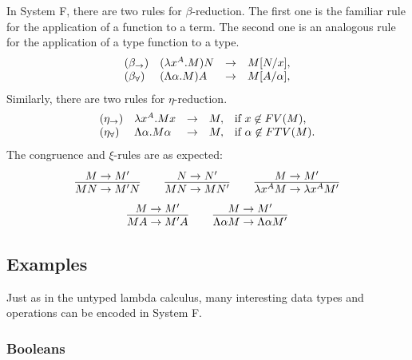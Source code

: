 \documentclass{article}
\begin{document}
In System F, there are two rules for $\beta$-reduction. The first one
is the familiar rule for the application of a function to a term. The
second one is an analogous rule for the application of a type function
to a type. 
\[ \begin{array}{lllll}
  (\beta_{\to}) & (\lambda x^{A}.M)N & \to & M[N/x], \\
  (\beta_{\forall}) & (\Lambda\alpha.M)A & \to & M[A/\alpha],
\end{array}
\]
Similarly, there are two rules for $\eta$-reduction.
\[ \begin{array}{lllll}
  (\eta_{\to}) & \lambda x^{A}.Mx & \to & M, & \mbox{if $x\not\in FV(M)$,} \\
  (\eta_{\forall}) & \Lambda\alpha.M\alpha & \to & M, & \mbox{if $\alpha\not\in FTV(M)$.}
\end{array}
\]
The congruence and $\xi$-rules are as expected:
\[ \deriv{M\to M'}{MN\to M'N}
   \sep
   \deriv{N\to N'}{MN\to MN'}
   \sep
   \deriv{M\to M'}{\lamabs{x}{A}{M}\to\lamabs{x}{A}{M'}}
\]
\[ \deriv{M\to M'}{MA\to M'A}
   \sep
   \deriv{M\to M'}{\Lamabs{\alpha}{M}\to\Lamabs{\alpha}{M'}}
\]

\subsection{Examples}

Just as in the untyped lambda calculus, many interesting data types
and operations can be encoded in System F. 

\subsubsection{Booleans}
\end{document}
